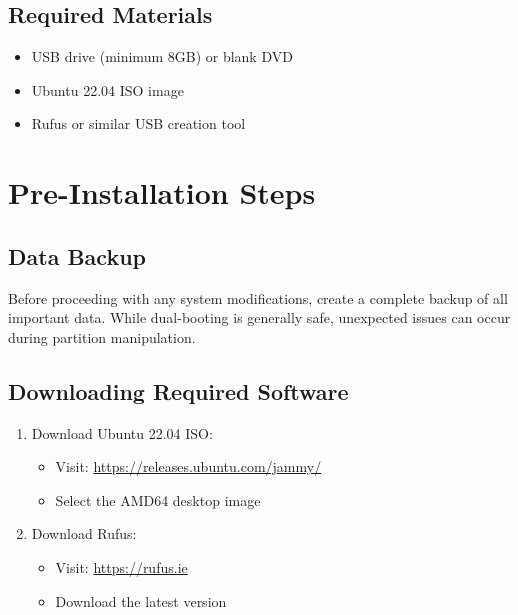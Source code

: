 \documentclass[11pt,a4paper]{article}
\newenvironment{warning}
{\begin{tcolorbox}[colback=warningcolor!10,colframe=warningcolor,title=\textbf{Warning}]}
{\end{tcolorbox}}
\newenvironment{note}
{\begin{tcolorbox}[colback=notecolor!10,colframe=notecolor,title=\textbf{Note}]}
{\end{tcolorbox}}
\begin{document}
\subsection{Required Materials}
\begin{itemize}
    \item USB drive (minimum 8GB) or blank DVD
    \item Ubuntu 22.04 ISO image
    \item Rufus or similar USB creation tool
\end{itemize}

\section{Pre-Installation Steps}
\subsection{Data Backup}
\begin{warning}
Before proceeding with any system modifications, create a complete backup of all important data. While dual-booting is generally safe, unexpected issues can occur during partition manipulation.
\end{warning}

\subsection{Downloading Required Software}
\begin{enumerate}
    \item Download Ubuntu 22.04 ISO:
    \begin{itemize}
        \item Visit: \url{https://releases.ubuntu.com/jammy/}
        \item Select the AMD64 desktop image
    \end{itemize}
    \item Download Rufus:
    \begin{itemize}
        \item Visit: \url{https://rufus.ie}
        \item Download the latest version
    \end{itemize}
\end{enumerate}
\end{document}
